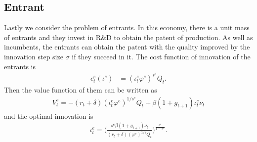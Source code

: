 \documentclass[a4paper,12pt]{article}
\begin{document}
\subsection{Entrant}
Lastly we consider the problem of entrants. In this economy, there is a unit mass of entrants and they invest in R\&D to obtain the patent of production. As well as incumbents, the entrants can obtain the patent with the quality improved by the innovation step size $\sigma$ if they succeed in it. The cost function of innovation of the entrants is
\begin{align}
    c^e_t(\iota^e) &= (\iota_t^e\varphi^e)^{s^e} Q_t.
\end{align}
Then the value function of them can be written as
\begin{align}
    V_t^e = -(r_t+\delta)(\iota_t^e\varphi^e)^{1/s^e}Q_t + \beta (1+g_{t+1})\iota_t^e \nu_t
\end{align}
and the optimal innovation is
\begin{align}
    \iota_t^e = \Big(\frac{s^e\beta (1+g_{t+1})\nu_t}{(r_t+\delta)(\varphi^e)^{1/s}Q_t}\Big)^\frac{s^e}{1-s^e}.
\end{align}
\end{document}

